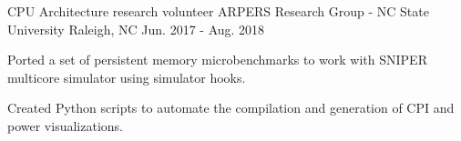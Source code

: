 \par\addvspace{-0.5ex}


\begin{cventries}

  \cventry
    {CPU Architecture research volunteer} %
    {ARPERS Research Group - NC State University} %
    {Raleigh, NC} %
    {\color{darkgray}Jun. 2017 - Aug. 2018} %
    {
      \begin{cvitems} %
        \item {Ported a set of persistent memory microbenchmarks to work with SNIPER multicore simulator using simulator hooks.}
        \item {Created Python scripts to automate the compilation and generation of CPI and power visualizations. }
      \end{cvitems}
    }



\end{cventries}

